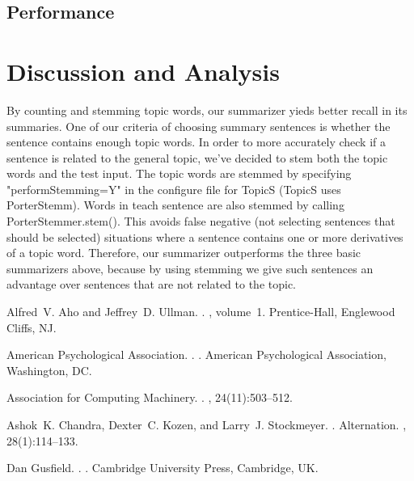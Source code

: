 \documentclass[11pt,letterpaper]{article}
\begin{document}
\subsection{Performance}

\section{Discussion and Analysis}

\noindent By counting and stemming topic words, our summarizer yieds better recall in its summaries. One of our criteria of choosing summary sentences is whether the sentence contains enough topic words. In order to more accurately check if a sentence is related to the general topic, we've decided to stem both the topic words and the test input. The topic words are stemmed by specifying "performStemming=Y" in the configure file for TopicS (TopicS uses PorterStemm). Words in teach sentence are also stemmed by calling PorterStemmer.stem(). This avoids false negative (not selecting sentences that should be selected) situations where a sentence contains one or more derivatives of a topic word. Therefore, our summarizer outperforms the three basic summarizers above, because by using stemming we give such sentences an advantage over sentences that are not related to the topic.
\begin{thebibliography}{}

Alfred~V. Aho and Jeffrey~D. Ullman.
.
, volume~1.
\newblock Prentice-{Hall}, Englewood Cliffs, NJ.

{American Psychological Association}.
.
.
\newblock American Psychological Association, Washington, DC.

{Association for Computing Machinery}.
.
, 24(11):503--512.

Ashok~K. Chandra, Dexter~C. Kozen, and Larry~J. Stockmeyer.
.
\newblock Alternation.
,
  28(1):114--133.

Dan Gusfield.
.
.
\newblock Cambridge University Press, Cambridge, UK.

\end{thebibliography}
\end{document}
